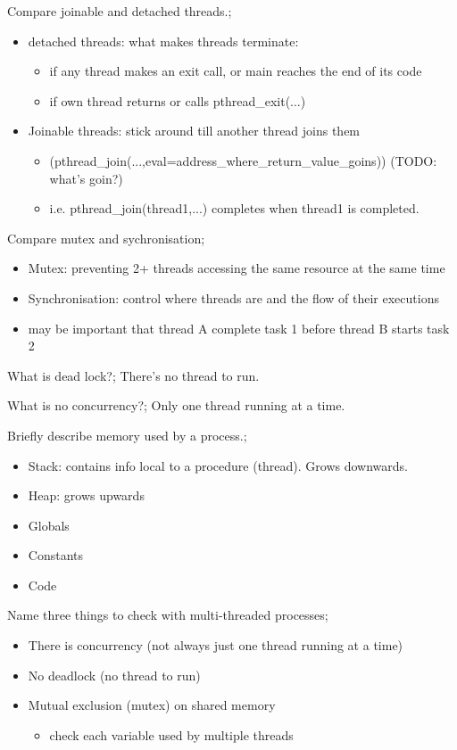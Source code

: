 \documentclass{article}
\begin{document}
Compare joinable and detached threads.; \begin{itemize} \item detached threads: what makes threads terminate: \begin{itemize} \item if any thread makes an exit call, or main reaches the end of its code \item if own thread returns or calls pthread\_exit(...)  \end{itemize} \item Joinable threads: stick around till another thread joins them \begin{itemize} \item (pthread\_join(...,eval=address\_where\_return\_value\_goins)) (TODO: what's goin?) \item i.e. pthread\_join(thread1,...) completes when thread1 is completed.  \end{itemize} \end{itemize}

Compare mutex and sychronisation; \begin{itemize} \item Mutex: preventing 2+ threads accessing the same resource at the same time \item Synchronisation: control where threads are and the flow of their executions \item may be important that thread A complete task 1 before thread B starts task 2 \end{itemize}

What is dead lock?; There's no thread to run.

What is no concurrency?; Only one thread running at a time.

Briefly describe memory used by a process.; \begin{itemize} \item Stack: contains info local to a procedure (thread). Grows downwards. \item Heap: grows upwards \item Globals \item Constants \item Code \end{itemize}

Name three things to check with multi-threaded processes; \begin{itemize} \item There is concurrency (not always just one thread running at a time) \item No deadlock (no thread to run) \item Mutual exclusion (mutex) on shared memory \begin{itemize} \item check each variable used by multiple threads \end{itemize} \end{itemize}
\end{document}
